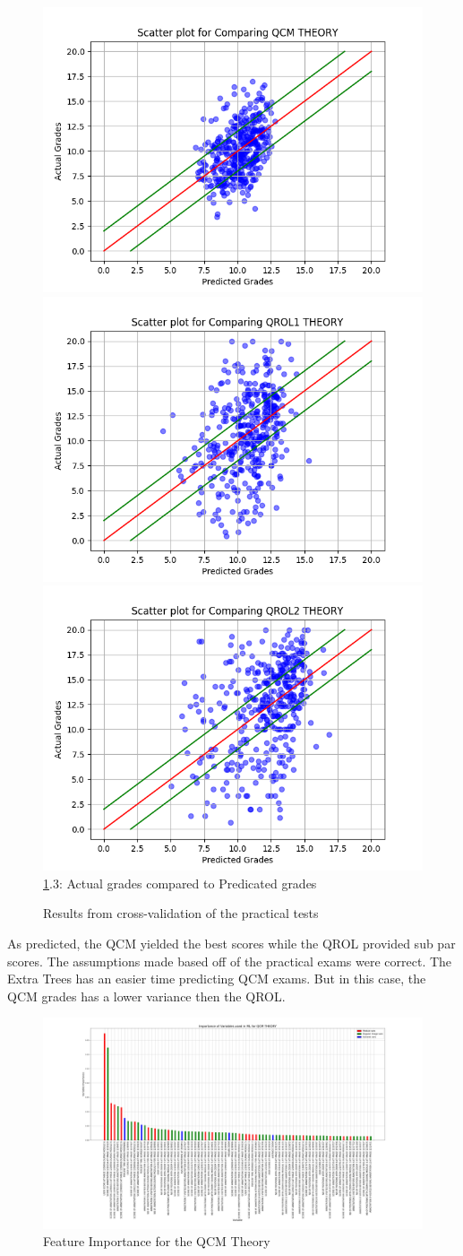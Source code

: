 \documentclass[a4paper,11pt]{report}
\numberwithin{figure}{section} %
\begin{document}
\begin{figure}[H]
      \includegraphics[width=.30\linewidth]{cv_comp_QCM_THEORY_2018-04-30_13_57_05.png}
      \includegraphics[width=.30\linewidth]{cv_comp_QROL1_THEORY_2018-04-30_13_40_50.png}
  	  \includegraphics[width=.30\linewidth]{cv_comp_QROL2_THEORY_2018-04-30_13_12_52.png}
      \\
      \ref{fig:results_theo}.3: Actual grades compared to Predicated grades
      \caption{Results from cross-validation of the practical tests}
      \label{fig:results_theo}
    \end{figure}
    
    As predicted, the QCM yielded the best scores while the QROL provided sub par scores.
    The assumptions made based off of the practical exams were correct.
    The Extra Trees has an easier time predicting QCM exams.
    But in this case, the QCM grades has a lower variance then the QROL.


     \begin{figure}[H]
      \centering
      \includegraphics[width=.95\linewidth]{var_importance_QCM_THEORY_2018-05-02_20_53_18.png}
      \caption{Feature Importance for the QCM Theory}
      \label{fig:var_th1}
      \end{figure}
      
\end{document}
